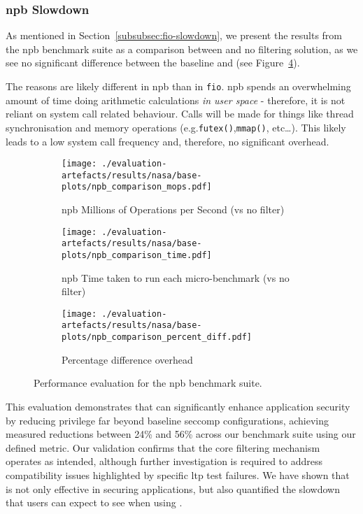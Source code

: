 \subsubsection{\ac{npb} Slowdown}\label{subsubsec:npb-slowdown}

As mentioned in Section~\ref{subsubsec:fio-slowdown}, we present the results
from the \ac{npb} benchmark suite as a comparison between \af and no filtering
solution, as we see no significant difference between the baseline and \af (see
Figure~\ref{fig:npb-perf}).

The reasons are likely different in \ac{npb} than in \texttt{fio}. \ac{npb}
spends an overwhelming amount of time doing arithmetic calculations \textit{in
user space} - therefore, it is not reliant on system call related behaviour.
Calls will be made for things like thread synchronisation and memory 
operations (e.g.\texttt{futex()},{}\texttt{mmap()}, etc\dots). This likely
leads to a low system call frequency and, therefore, no significant overhead.

\begin{figure}[htbp]
    \centering
    \begin{subfigure}[b]{0.7 \textwidth}
        \centering
        \texttt{[image: ./evaluation-artefacts/results/nasa/base-plots/npb\_comparison\_mops.pdf]} 
        \caption{\ac{npb} Millions of Operations per Second (\af vs no filter)}
        \label{fig:npb-mops}
    \end{subfigure}
    \hfill
     \begin{subfigure}[b]{0.7 \textwidth}
        \centering
        \texttt{[image: ./evaluation-artefacts/results/nasa/base-plots/npb\_comparison\_time.pdf]} 
        \caption{\ac{npb} Time taken to run each micro-benchmark (\af vs no
        filter)}
        \label{fig:npb-time}
    \end{subfigure}
     \medskip 
     \begin{subfigure}[b]{0.7 \textwidth}
        \centering
        \texttt{[image: ./evaluation-artefacts/results/nasa/base-plots/npb\_comparison\_percent\_diff.pdf]} %
        \caption{Percentage difference overhead}
        \label{fig:npb-percdiff}
    \end{subfigure}

    \caption{Performance evaluation for the \ac{npb} benchmark suite.}
    \label{fig:npb-perf}
\end{figure}

This evaluation demonstrates that \af can significantly enhance
application security by reducing privilege far beyond baseline seccomp
configurations, achieving measured reductions between 24\% and 56\% across
our benchmark suite using our defined metric. Our validation
confirms that the core filtering mechanism operates as intended, although further
investigation is required to address compatibility issues highlighted by
specific \ac{ltp} test failures. We have shown that \af is not only effective
in securing applications, but also quantified the slowdown that users can 
expect to see when using \af.

